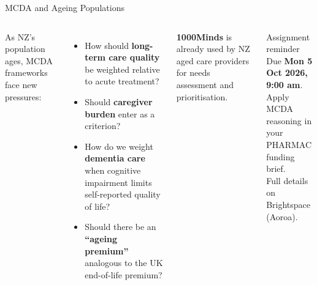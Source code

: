 \documentclass[aspectratio=169, 12pt]{beamer}
\begin{document}
\begin{frame}{MCDA and Ageing Populations}
  \begin{columns}
      \footnotesize As NZ's population ages, MCDA frameworks face new pressures:
      \begin{itemize}
        \item How should \textbf{long-term care quality} be weighted relative to acute treatment?
        \item Should \textbf{caregiver burden} enter as a criterion?
        \item How do we weight \textbf{dementia care} when cognitive impairment limits
              self-reported quality of life?
        \item Should there be an \textbf{``ageing premium''} analogous to the UK end-of-life premium?
      \end{itemize}
      \vspace{0.15em}
      \footnotesize \textbf{1000Minds} is already used by NZ aged care providers for needs assessment and prioritisation.
      \begin{block}{Assignment reminder}
        \small Due \textbf{Mon 5 Oct 2026, 9:00 am}.\\[0.2em]
        Apply MCDA reasoning in your PHARMAC funding brief.\\[0.15em]
        Full details on Brightspace (Aoroa).
      \end{block}
  \end{columns}
\end{frame}

\end{document}
